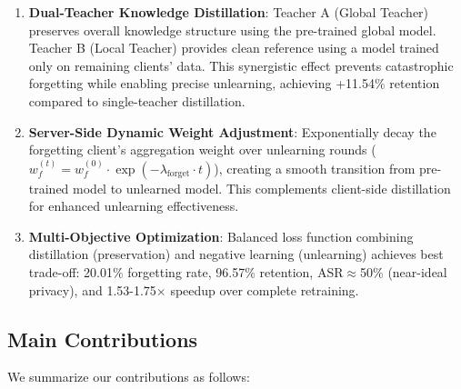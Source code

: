 \documentclass[10pt,twocolumn]{article}
\begin{document}
\begin{enumerate}
\item \textbf{Dual-Teacher Knowledge Distillation}: Teacher A (Global Teacher) preserves overall knowledge structure using the pre-trained global model. Teacher B (Local Teacher) provides clean reference using a model trained only on remaining clients' data. This synergistic effect prevents catastrophic forgetting while enabling precise unlearning, achieving +11.54\% retention compared to single-teacher distillation.

\item \textbf{Server-Side Dynamic Weight Adjustment}: Exponentially decay the forgetting client's aggregation weight over unlearning rounds ($w_f^{(t)} = w_f^{(0)} \cdot \exp(-\lambda_{\text{forget}} \cdot t)$), creating a smooth transition from pre-trained model to unlearned model. This complements client-side distillation for enhanced unlearning effectiveness.

\item \textbf{Multi-Objective Optimization}: Balanced loss function combining distillation (preservation) and negative learning (unlearning) achieves best trade-off: 20.01\% forgetting rate, 96.57\% retention, ASR$\approx$50\% (near-ideal privacy), and 1.53-1.75$\times$ speedup over complete retraining.
\end{enumerate}

\subsection{Main Contributions}

We summarize our contributions as follows:
\end{document}
